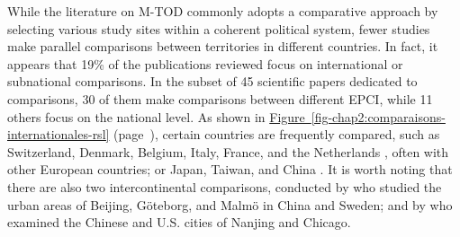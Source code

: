 \begin{refsegment}
While the literature on \acrshort{M-TOD} commonly adopts a comparative approach by selecting various study sites within a coherent political system, fewer studies make parallel comparisons between territories in different countries. In fact, it appears that 19\% of the publications reviewed focus on international or subnational comparisons. In the subset of 45 scientific papers dedicated to comparisons, 30 of them make comparisons between different \acrshort{EPCI}, while 11 others focus on the national level. As shown in \hyperref[fig-chap2:comparaisons-internationales-rsl]{Figure~\ref{fig-chap2:comparaisons-internationales-rsl}} (page~\pageref{fig-chap2:comparaisons-internationales-rsl}), certain countries are frequently compared, such as Switzerland, Denmark, Belgium, Italy, France, and the Netherlands \textcolor{blue}{\autocites[29-46]{abours_rapport_2015}[279-285]{sebban_complementarite_2003}[282-284]{martens_bicycle_2004}}, often with other European countries; or Japan, Taiwan, and China \textcolor{blue}{\autocite[212]{lin_built_2018}}. It is worth noting that there are also two intercontinental comparisons, conducted by \textcolor{blue}{\textcite[4]{hamidi_shaping_2020}} who studied the urban areas of Beijing, Göteborg, and Malmö in China and Sweden; and by \textcolor{blue}{\textcite[13]{hua_transfer_2022}} who examined the Chinese and U.S. cities of Nanjing and Chicago.%


\end{refsegment}

